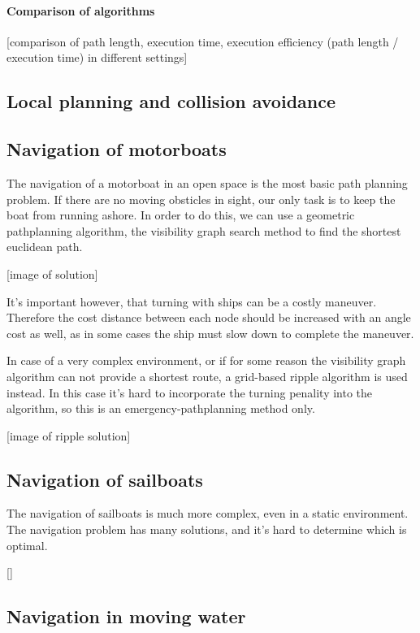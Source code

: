 \paragraph{Comparison of algorithms}

[comparison of path length, execution time, execution efficiency (path length / execution time) in different settings]

\subsection{Local planning and collision avoidance}

\subsection{Navigation of motorboats}

The navigation of a motorboat in an open space is the most basic path planning problem. If there are no moving obsticles in sight, our only task is to keep the boat from running ashore. In order to do this, we can use a geometric pathplanning algorithm, the visibility graph search method to find the shortest euclidean path.

[image of solution]

It's important however, that turning with ships can be a costly maneuver. Therefore the cost distance between each node should be increased with an angle cost as well, as in some cases the ship must slow down to complete the maneuver.

In case of a very complex environment, or if for some reason the visibility graph algorithm can not provide a shortest route, a grid-based ripple algorithm is used instead. In this case it's hard to incorporate the turning penality into the algorithm, so this is an emergency-pathplanning method only.

[image of ripple solution]

\subsection{Navigation of sailboats}

The navigation of sailboats is much more complex, even in a static environment. The navigation problem has many solutions, and it's hard to determine which is optimal.

[]

\subsection{Navigation in moving water}

